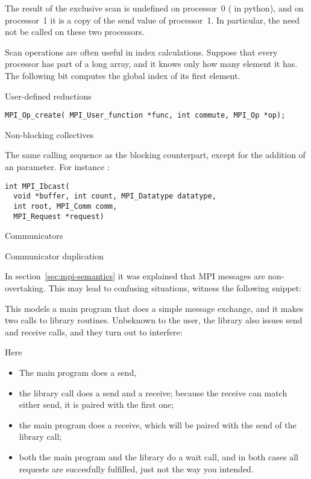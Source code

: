 The result of the exclusive scan is undefined on processor~0
( in python),
and on processor~1 it is a copy of the send value of processor~1.
In particular, the  need not be called on these two 
processors.

Scan operations are often useful in index calculations. Suppose that every processor
has part of a long array, and it knows only how many element it has. The following bit
computes the global index of its first element.

 {User-defined reductions}

\begin{verbatim}
MPI_Op_create( MPI_User_function *func, int commute, MPI_Op *op);
\end{verbatim}

 {Non-blocking collectives}

The same calling sequence as the blocking counterpart, except for the addition
of an  parameter. For instance 
:
\begin{verbatim}
int MPI_Ibcast(
  void *buffer, int count, MPI_Datatype datatype,
  int root, MPI_Comm comm, 
  MPI_Request *request)
\end{verbatim}

 {Communicators}

 {Communicator duplication}

In section~\ref{sec:mpi-semantics} it was explained that MPI messages are 
non-overtaking. This may lead to confusing situations, witness the following snippet:


This models a main program that does a simple message exchange, and it
makes two calls to library routines. Unbeknown to the user, the
library also issues send and receive calls, and they turn out to
interfere:


Here
\begin{itemize}
\item The main program does a send,
\item the library call  does a send and a receive;
  because the receive can match either send, it is paired with the
  first one;
\item the main program does a receive, which will be paired with the send of the 
  library call;
\item both the main program and the library do a wait call, and in
  both cases all requests are succesfully fulfilled, just not the way
  you intended.
\end{itemize}

